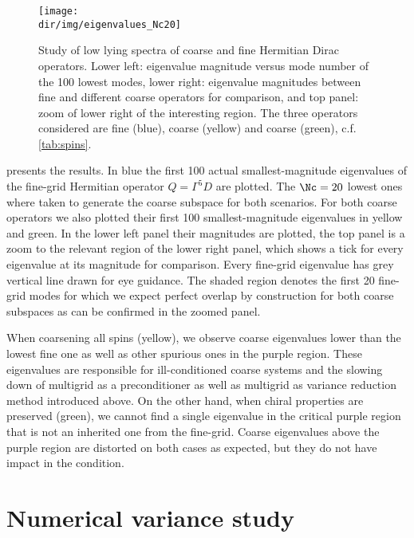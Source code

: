 \begin{figure}
\centering
\texttt{[image: \\dir/img/eigenvalues\_Nc20]}
\caption{
Study of low lying spectra of coarse and fine Hermitian Dirac operators.
Lower left: eigenvalue magnitude versus mode number of the \num{100} lowest modes, lower right: eigenvalue magnitudes between fine and different coarse operators for comparison, and top panel: zoom of lower right of the interesting region.
The three operators considered are fine (blue), coarse  (yellow) and coarse  (green), c.f. \cref{tab:spins}.
\takenfull
}
\label{fig:chirality:spectrum}
\end{figure}

 presents the results.
In blue the first \num{100} actual smallest-magnitude eigenvalues of the fine-grid Hermitian operator $Q = \Gamma^5 D$ are plotted.
The $\Nc=20$ lowest ones where taken to generate the coarse subspace for both scenarios.
For both coarse operators we also plotted their first \num{100} smallest-magnitude eigenvalues in yellow and green.
In the lower left panel their magnitudes are plotted, the top panel is a zoom to the relevant region of the lower right panel, which shows a tick for every eigenvalue at its magnitude for comparison.
Every fine-grid eigenvalue has grey vertical line drawn for eye guidance.
The shaded region denotes the first \num{20} fine-grid modes for which we expect perfect overlap by construction for both coarse subspaces as can be confirmed in the zoomed panel.

When coarsening all spins (yellow), we observe coarse eigenvalues lower than the lowest fine one as well as other spurious ones in the purple region.
These eigenvalues are responsible for ill-conditioned coarse systems and the slowing down of multigrid as a preconditioner as well as multigrid as variance reduction method introduced above.
On the other hand, when chiral properties are preserved (green), we cannot find a single eigenvalue in the critical purple region that is not an inherited one from the fine-grid.
Coarse eigenvalues above the purple region are distorted on both cases as expected, but they do not have impact in the condition.

\section{Numerical variance study}

